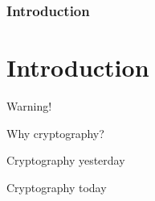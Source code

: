 \section[Section]{Introduction}
\part{Introduction}

\begin{frame}{Warning!}

  


  

\end{frame}

\begin{frame}{Why cryptography?}

\end{frame}

\begin{frame}{Cryptography yesterday}
    

\end{frame}

\begin{frame}{Cryptography today}
    

\end{frame}
